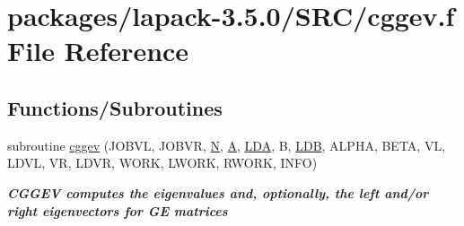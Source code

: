 \hypertarget{cggev_8f}{}\section{packages/lapack-\/3.5.0/\+S\+R\+C/cggev.f File Reference}
\label{cggev_8f}
\subsection*{Functions/\+Subroutines}
\begin{DoxyCompactItemize}
\item 
subroutine \hyperlink{group__complexGEeigen_ga791495feb4709cb91cf39a996a5e3f5a}{cggev} (J\+O\+B\+V\+L, J\+O\+B\+V\+R, \hyperlink{polmisc_8c_a0240ac851181b84ac374872dc5434ee4}{N}, \hyperlink{classA}{A}, \hyperlink{example__user_8c_ae946da542ce0db94dced19b2ecefd1aa}{L\+D\+A}, B, \hyperlink{example__user_8c_a50e90a7104df172b5a89a06c47fcca04}{L\+D\+B}, A\+L\+P\+H\+A, B\+E\+T\+A, V\+L, L\+D\+V\+L, V\+R, L\+D\+V\+R, W\+O\+R\+K, L\+W\+O\+R\+K, R\+W\+O\+R\+K, I\+N\+F\+O)
\begin{DoxyCompactList}\small\item\em {\bfseries  C\+G\+G\+E\+V computes the eigenvalues and, optionally, the left and/or right eigenvectors for G\+E matrices} \end{DoxyCompactList}\end{DoxyCompactItemize}
